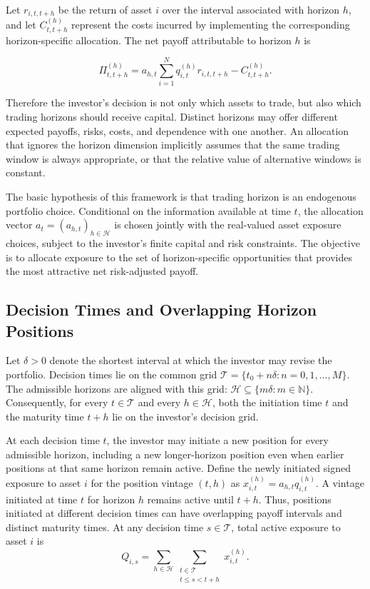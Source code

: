\documentclass{article}
\begin{document}
Let $r_{i,t,t+h}$ be the return of asset $i$ over the interval associated
with horizon $h$, and let $C_{t,t+h}^{(h)}$ represent the costs incurred
by implementing the corresponding horizon-specific allocation. The net
payoff attributable to horizon $h$ is

\[
    \Pi_{t,t+h}^{(h)}
    =
    a_{h,t}
    \sum_{i=1}^{N} q_{i,t}^{(h)} r_{i,t,t+h}
    -
    C_{t,t+h}^{(h)}.
\]

Therefore the investor's decision is not only which assets to trade,
but also which trading horizons should receive capital. Distinct
horizons may offer different expected payoffs, risks, costs, and
dependence with one another. An allocation that ignores the horizon
dimension implicitly assumes that the same trading window is always
appropriate, or that the relative value of alternative windows is
constant.

The basic hypothesis of this framework is that trading horizon is an
endogenous portfolio choice. Conditional on the information available
at time $t$, the allocation vector
$
    a_t = (a_{h,t})_{h \in \mathcal{H}}
$
is chosen jointly with the real-valued asset exposure choices, subject
to the investor's finite capital and risk constraints. The objective is to allocate exposure to
the set of horizon-specific opportunities that provides the most
attractive net risk-adjusted payoff. 

\subsection{Decision Times and Overlapping Horizon Positions}

Let $\delta>0$ denote the shortest interval at which the investor may
revise the portfolio. Decision times lie on the common grid
$
    \mathcal{T}
    =
    \{t_0+n\delta:n=0,1,\ldots,M\}.
$
The admissible horizons are aligned with this grid:
$
    \mathcal{H} \subseteq \{m\delta:m\in\mathbb{N}\}.
$
Consequently, for every $t\in\mathcal{T}$ and every
$h\in\mathcal{H}$, both the initiation time $t$ and the maturity time
$t+h$ lie on the investor's decision grid.

At each decision time $t$, the investor may initiate a new position for
every admissible horizon, including a new longer-horizon position even
when earlier positions at that same horizon remain active. Define the
newly initiated signed exposure to asset $i$ for the position vintage
$(t,h)$ as
$
    x_{i,t}^{(h)} = a_{h,t}q_{i,t}^{(h)}.
$
A vintage initiated at time $t$ for horizon $h$ remains active until
$t+h$. Thus, positions initiated at different decision times can have
overlapping payoff intervals and distinct maturity times. At any
decision time $s\in\mathcal{T}$, total active exposure to asset $i$ is
\[
    Q_{i,s}
    =
    \sum_{h \in \mathcal{H}}
    \sum_{\substack{t \in \mathcal{T} \\ t \leq s < t+h}}
    x_{i,t}^{(h)}.
\]
\end{document}

